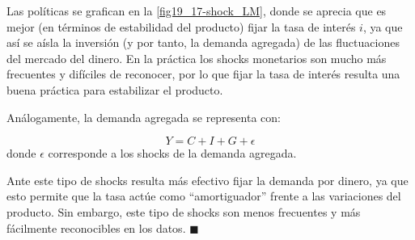 \documentclass[DeGregorioResumen]{subfiles}
\begin{document}
Las políticas se grafican en la \autoref{fig19_17-shock_LM}, donde se aprecia que es mejor (en términos de estabilidad del producto) fijar la tasa de interés $i$, ya que así se aísla la inversión (y por tanto, la demanda agregada) de las fluctuaciones del mercado del dinero. En la práctica los shocks monetarios son mucho más frecuentes y difíciles de reconocer, por lo que fijar la tasa de interés resulta una buena práctica para estabilizar el producto.




Análogamente, la demanda agregada se representa con:

\[
Y=C+I+G + \epsilon
\]
donde $\epsilon$ corresponde a los shocks de la demanda agregada.

Ante este tipo de shocks resulta más efectivo fijar la demanda por dinero, ya que esto permite que la tasa actúe como ``amortiguador'' frente a las variaciones del producto. Sin embargo, este tipo de shocks son menos frecuentes y más fácilmente reconocibles en los datos. $\blacksquare$
\end{document}

